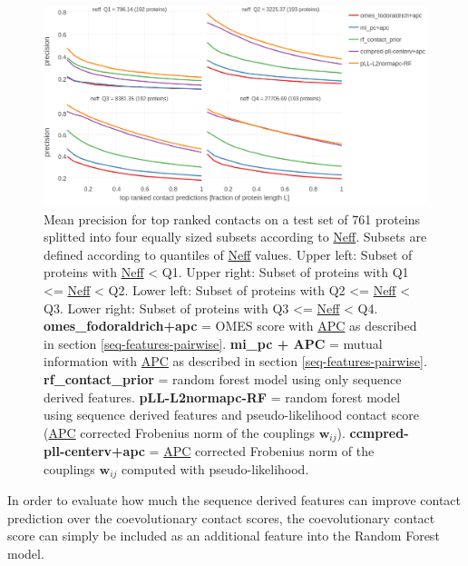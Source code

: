\documentclass[12pt,a4paper,twoside]{book}
\newcommand{\wij}{\mathbf{w}_{ij}}
\theoremstyle{definition}
\theoremstyle{definition}
\theoremstyle{remark}
\begin{document}
\begin{figure}
\includegraphics[width=1\linewidth]{img/random_forest_contact_prior/precision_vs_rank_facetted_by_neff_notitle} \caption{Mean precision for top
ranked contacts on a test set of 761 proteins splitted into four equally
sized subsets according to \protect\hyperlink{abbrev}{Neff}. Subsets are
defined according to quantiles of \protect\hyperlink{abbrev}{Neff}
values. Upper left: Subset of proteins with
\protect\hyperlink{abbrev}{Neff} \textless{} Q1. Upper right: Subset of
proteins with Q1 \textless{}= \protect\hyperlink{abbrev}{Neff}
\textless{} Q2. Lower left: Subset of proteins with Q2 \textless{}=
\protect\hyperlink{abbrev}{Neff} \textless{} Q3. Lower right: Subset of
proteins with Q3 \textless{}= \protect\hyperlink{abbrev}{Neff}
\textless{} Q4. \textbf{omes\_fodoraldrich+apc} = OMES score with
\protect\hyperlink{abbrev}{APC} as described in section
\ref{seq-features-pairwise}. \textbf{mi\_pc + APC} = mutual information
with \protect\hyperlink{abbrev}{APC} as described in section
\ref{seq-features-pairwise}. \textbf{rf\_contact\_prior} = random forest
model using only sequence derived features. \textbf{pLL-L2normapc-RF} =
random forest model using sequence derived features and
pseudo-likelihood contact score (\protect\hyperlink{abbrev}{APC}
corrected Frobenius norm of the couplings \(\wij\)).
\textbf{ccmpred-pll-centerv+apc} = \protect\hyperlink{abbrev}{APC}
corrected Frobenius norm of the couplings \(\wij\) computed with
pseudo-likelihood.}\label{fig:performance-neff-rf-with-pll-score}
\end{figure}

In order to evaluate how much the sequence derived features can improve
contact prediction over the coevolutionary contact scores, the
coevolutionary contact score can simply be included as an additional
feature into the Random Forest model.
\end{document}
